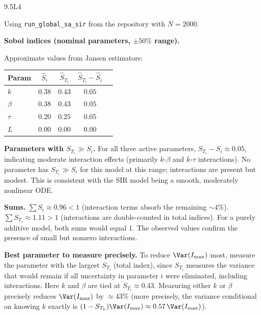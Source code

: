 \begin{solution}{9.5}{L4}

\solanswer

Using \texttt{run\_global\_sa\_sir} from the repository with $N = 2000$.

 \textbf{Sobol indices (nominal parameters, $\pm50\%$ range).}

Approximate values from Jansen estimators:
\begin{center}
\begin{tabular}{lcccc}
\toprule
Param & $\hat{S}_i$ & $\hat{S}_{T_i}$ & $\hat{S}_{T_i} - \hat{S}_i$ \\
\midrule
$k$     & $0.38$ & $0.43$ & $0.05$ \\
$\beta$ & $0.38$ & $0.43$ & $0.05$ \\
$\tau$  & $0.20$ & $0.25$ & $0.05$ \\
$L$     & $0.00$ & $0.00$ & $0.00$ \\
\bottomrule
\end{tabular}
\end{center}

 \textbf{Parameters with $S_{T_i} \gg S_i$.}
For all three active parameters, $S_{T_i} - S_i \approx 0.05$, indicating
moderate interaction effects (primarily $k$-$\beta$ and $k$-$\tau$ interactions).
No parameter has $S_{T_i} \gg S_i$ for this model at this range;
interactions are present but modest. This is consistent with the SIR model
being a smooth, moderately nonlinear ODE.

 \textbf{Sums.}
$\sum S_i \approx 0.96 < 1$ (interaction terms absorb the remaining $\sim4\%$).
$\sum S_{T_i} \approx 1.11 > 1$ (interactions are double-counted in total indices).
For a purely additive model, both sums would equal 1. The observed values
confirm the presence of small but nonzero interactions.

 \textbf{Best parameter to measure precisely.}
To reduce $\Var(I_{\max})$ most, measure the parameter with the largest
$S_{T_i}$ (total index), since $S_{T_i}$ measures the variance that
would remain if all uncertainty in parameter $i$ were eliminated, including
interactions. Here $k$ and $\beta$ are tied at $S_{T_i} \approx 0.43$.
Measuring either $k$ or $\beta$ precisely reduces $\Var(I_{\max})$
by $\approx 43\%$ (more precisely, the variance conditional on knowing $k$ exactly
is $(1 - S_{T_k})\Var(I_{\max}) \approx 0.57\,\Var(I_{\max})$).


\end{solution}

